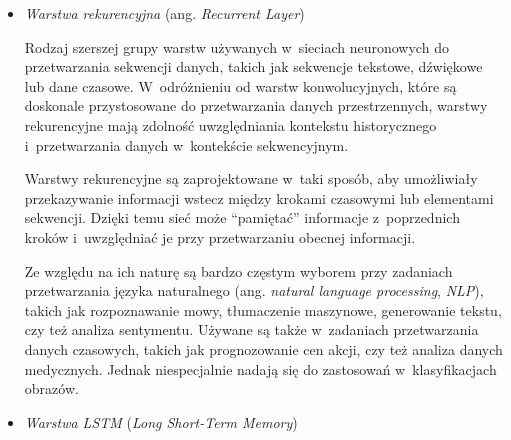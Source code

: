 {\begin{itemize}
        Bardzo popularny rodzaj warstwy w~głębokich sieciach neuronowych, szczególnie dobrze radzący sobie z~ekstrahowaniem lokalnych cech danych przestrzennych, takich jak obrazy, co sprawia, że są niezastąpione w~zadaniach związanych z~analizą wizualną \cite{albawi2017understanding}.

        Główną cechą warstwy konwolucyjnej jest operacja konwolucji, która polega na przesuwaniu tak zwanego jądra konwolucyjnego (inaczej filtru) po danych wejściowych, takich jak obraz.
        Jądro to jest macierzą wag, która jest zdefiniowana przez projektanta modelu i~jest uczona podczas procesu treningu.

        Operacja konwolucji umożliwia sieciom neuronowym wykrywanie krawędzi, tekstur, wzorców geometrycznych i~innych cech charakterystycznych obiektów na obrazie.
        Ponadto, stosowanie wielu warstw konwolucyjnych o~różnych rozmiarach filtrów pozwala na wykrywanie coraz bardziej złożonych i~abstrakcyjnych cech.

  \item \emph{Warstwa rekurencyjna} (ang. \emph{Recurrent Layer})

        Rodzaj szerszej grupy warstw używanych w~sieciach neuronowych do przetwarzania sekwencji danych, takich jak sekwencje tekstowe, dźwiękowe lub dane czasowe.
        W~odróżnieniu od warstw konwolucyjnych, które są doskonale przystosowane do przetwarzania danych przestrzennych, warstwy rekurencyjne mają zdolność uwzględniania kontekstu historycznego i~przetwarzania danych w~kontekście sekwencyjnym.

        Warstwy rekurencyjne są zaprojektowane w~taki sposób, aby umożliwiały przekazywanie informacji wstecz między krokami czasowymi lub elementami sekwencji.
        Dzięki temu sieć może ``pamiętać'' informacje z~poprzednich kroków i~uwzględniać je przy przetwarzaniu obecnej informacji.

        Ze względu na ich naturę są bardzo częstym wyborem przy zadaniach przetwarzania języka naturalnego (ang. \emph{natural language processing}, \emph{NLP}), takich jak rozpoznawanie mowy, tłumaczenie maszynowe, generowanie tekstu, czy też analiza sentymentu.
        Używane są także w~zadaniach przetwarzania danych czasowych, takich jak prognozowanie cen akcji, czy też analiza danych medycznych.
        Jednak niespecjalnie nadają się do zastosowań w~klasyfikacjach obrazów.

  \item \emph{Warstwa LSTM} (\emph{Long Short-Term Memory})


\end{itemize}}
